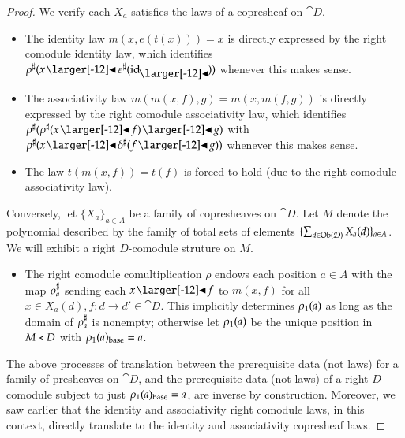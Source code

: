 \documentclass{amsart}
\begin{document}
\begin{proof}
  We verify each $X_a$ satisfies the laws of a copresheaf on $\cat{D}$.
  \begin{itemize}
  \item The identity law $m(x, e(t(x))) = x$ is directly expressed by
    the right comodule identity law, which identifies
    ${\anydirmapof{\rho}{x \subd \anydirmapof{\varepsilon}{\idsubd}}}$
    whenever this makes sense.
  \item The associativity law $m(m(x, f), g) = m(x, m(f, g))$ is
    directly expressed by the right comodule associativity law, which
    identifies
    ${\anydirmapof{\rho}{\anydirmapof{\rho}{x \subd f} \subd g}}$ with
    ${\anydirmapof{\rho}{x \subd \anydirmapof{\delta}{f \subd g}}}$ whenever this makes sense.
  \item The law $t(m(x, f)) = t(f)$ is forced to hold (due to the
    right comodule associativity law).
  \end{itemize}

  Conversely, let $\{X_a\}_{a \in A}$ be a family of copresheaves on
  $\cat{D}$. Let $M$ denote the polynomial described by the family of
  total sets of elements
  $\{\sum_{d \in \operatorname{Ob}(\mathcal{D})}X_a(d)\}_{a \in A}$. We will exhibit a right
  $D$-comodule struture on $M$.
  \begin{itemize}
  \item The right comodule comultiplication $\rho$ endows each position $a \in A$ with
    the map ${\rho}^\sharp_{a}$ sending each $x \subd f$ to $m(x, f)$ for
    all $x \in X_a(d), f: d \to d' \in \cat{D}$. This implicitly
    determines ${\rho}_1(a)$ as long as the domain of ${\rho}^\sharp_{a}$ is
    nonempty; otherwise let ${\rho}_1(a)$ be the unique position in
    $M \mathrel{\triangleleft} D$ with ${\rho}_1(a)_{\mathrm{base}} = a$.
  \end{itemize}

  The above processes of translation between the prerequisite data
  (not laws) for a family of presheaves on $\cat{D}$, and the
  prerequisite data (not laws) of a right $D$-comodule subject to just
  ${\rho}_1(a)_{\mathrm{base}} = a$, are inverse by
  construction. Moreover, we saw earlier that the identity and
  associativity right comodule laws, in this context, directly translate
  to the identity and associativity copresheaf laws.
\end{proof}
\end{document}

